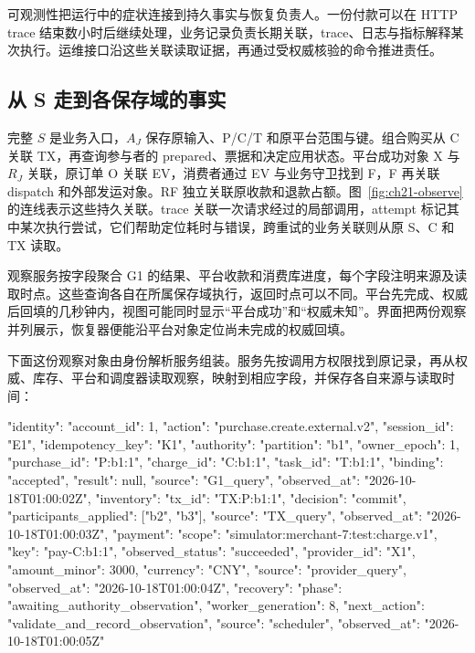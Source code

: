 可观测性把运行中的症状连接到持久事实与恢复负责人。一份付款可以在 HTTP trace 结束数小时后继续处理，业务记录负责长期关联，trace、日志与指标解释某次执行。运维接口沿这些关联读取证据，再通过受权威核验的命令推进责任。

\subsection{从 S 走到各保存域的事实}

完整 $S$ 是业务入口，$A_J$ 保存原输入、P/C/T 和原平台范围与键。组合购买从 C 关联 TX，再查询参与者的 prepared、票据和决定应用状态。平台成功对象 X 与 $R_J$ 关联，原订单 O 关联 EV，消费者通过 EV 与业务守卫找到 F，F 再关联 dispatch 和外部发运对象。RF 独立关联原收款和退款占额。图~\ref{fig:ch21-observe} 的连线表示这些持久关联。trace 关联一次请求经过的局部调用，attempt 标记其中某次执行尝试，它们帮助定位耗时与错误，跨重试的业务关联则从原 S、C 和 TX 读取。


观察服务按字段聚合 G1 的结果、平台收款和消费库进度，每个字段注明来源及读取时点。这些查询各自在所属保存域执行，返回时点可以不同。平台先完成、权威后回填的几秒钟内，视图可能同时显示“平台成功”和“权威未知”。界面把两份观察并列展示，恢复器便能沿平台对象定位尚未完成的权威回填。

下面这份观察对象由身份解析服务组装。服务先按调用方权限找到原记录，再从权威、库存、平台和调度器读取观察，映射到相应字段，并保存各自来源与读取时间：
\begin{BookCode}
{
  "identity": {"account_id": 1,
    "action": "purchase.create.external.v2",
    "session_id": "E1", "idempotency_key": "K1"},
  "authority": {"partition": "b1", "owner_epoch": 1,
    "purchase_id": "P:b1:1",
    "charge_id": "C:b1:1", "task_id": "T:b1:1",
    "binding": "accepted", "result": null,
    "source": "G1_query", "observed_at": "2026-10-18T01:00:02Z"},
  "inventory": {"tx_id": "TX:P:b1:1", "decision": "commit",
    "participants_applied": ["b2", "b3"],
    "source": "TX_query", "observed_at": "2026-10-18T01:00:03Z"},
  "payment": {"scope": "simulator:merchant-7:test:charge.v1",
    "key": "pay-C:b1:1", "observed_status": "succeeded",
    "provider_id": "X1", "amount_minor": 3000,
    "currency": "CNY", "source": "provider_query",
    "observed_at": "2026-10-18T01:00:04Z"},
  "recovery": {"phase": "awaiting_authority_observation",
    "worker_generation": 8,
    "next_action": "validate_and_record_observation",
    "source": "scheduler", "observed_at": "2026-10-18T01:00:05Z"}
}
\end{BookCode}

